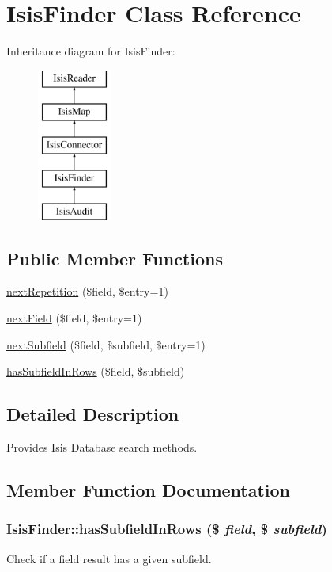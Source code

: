 \hypertarget{classIsisFinder}{
\section{IsisFinder Class Reference}
\label{classIsisFinder}
}
Inheritance diagram for IsisFinder:\begin{figure}[H]
\begin{center}
\leavevmode
\includegraphics[height=5cm]{classIsisFinder}
\end{center}
\end{figure}
\subsection*{Public Member Functions}
\begin{DoxyCompactItemize}
\item 
\hyperlink{classIsisFinder_ac4e3a8f45995cbf940b3f2899b71bd1e}{nextRepetition} (\$field, \$entry=1)
\item 
\hyperlink{classIsisFinder_a7d708e281bea35ee38f5875c8f2cad8d}{nextField} (\$field, \$entry=1)
\item 
\hyperlink{classIsisFinder_aa367980783d341197e003684a639ff1a}{nextSubfield} (\$field, \$subfield, \$entry=1)
\item 
\hyperlink{classIsisFinder_a41410b18c4462c05ac669e4ee889d8a7}{hasSubfieldInRows} (\$field, \$subfield)
\end{DoxyCompactItemize}


\subsection{Detailed Description}
Provides Isis Database search methods. 

\subsection{Member Function Documentation}
\hypertarget{classIsisFinder_a41410b18c4462c05ac669e4ee889d8a7}{
\subsubsection[{hasSubfieldInRows}]{\setlength{\rightskip}{0pt plus 5cm}IsisFinder::hasSubfieldInRows (\$ {\em field}, \/  \$ {\em subfield})}}
\label{classIsisFinder_a41410b18c4462c05ac669e4ee889d8a7}
Check if a field result has a given subfield.


